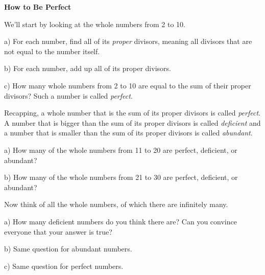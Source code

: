 \documentclass[12pt]{article}
\newcommand{\numb}[1]{\noindent{\bf #1)}}
\begin{document}
\centerline{\bf How to Be Perfect}

\bigskip




\bigskip

 

\bigskip

\numb{1} We'll start by looking at the whole numbers from 2 to 10.

\bigskip

a) For each number, find all of its \textit{proper} divisors, meaning all divisors that are not equal to the number itself. 

\bigskip

b) For each number, add up all of its proper divisors.

\bigskip

c) How many whole numbers from 2 to 10 are equal to the sum of their proper divisors? Such a number is called \textit{perfect}.


\newpage

\numb{2} Recapping, a whole number that is the sum of its proper divisors is called \textit{perfect}. A number that is bigger than the sum of its proper divisors is called \textit{deficient} and a number that is smaller than the sum of its proper divisors is called \textit{abundant}.

\bigskip

a) How many of the whole numbers from 11 to 20 are perfect, deficient, or abundant?

\bigskip

b) How many of the whole numbers from 21 to 30 are perfect, deficient, or abundant?



\newpage 

\numb{3} Now think of all the whole numbers, of which there are infinitely many.

\bigskip

a) How many deficient numbers do you think there are? Can you convince everyone that your answer is true? 

\bigskip

b) Same question for abundant numbers. 

\bigskip

c) Same question for perfect numbers. 


\newpage
\end{document}
